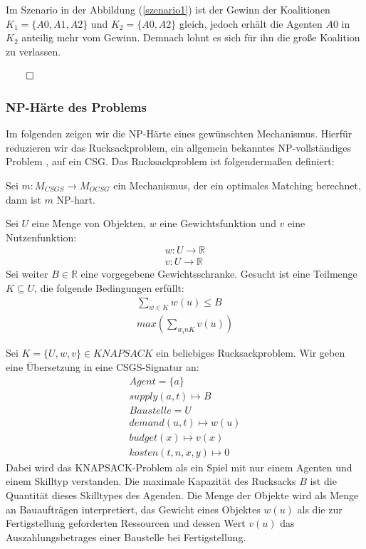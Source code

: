Im Szenario in der Abbildung (\ref{szenario1}) ist der Gewinn der Koalitionen $K_1 = \{A0, A1, A2\}$ und $K_2 = \{A0, A2\}$ gleich, jedoch erhält die Agenten $A0$ in $K_2$ anteilig mehr vom Gewinn. Demnach lohnt es sich für ihn die große Koalition zu verlassen.
\begin{flushright}
  $\qed$
\end{flushright}

\subsubsection{NP-Härte des Problems}
\label{np}
Im folgenden zeigen wir die NP-Härte eines gewünschten Mechanismus. Hierfür reduzieren wir das Rucksackproblem, ein allgemein bekanntes NP-vollständiges Problem \cite{Karp1972}, auf ein CSG.
Das Rucksackproblem ist folgendermaßen definiert:

\begin{lemma}
Sei $m:M_{CSGS}\rightarrow M_{OCSG}$ ein Mechanismus, der ein optimales Matching berechnet, dann ist $m$ NP-hart.
\end{lemma}

\begin{definition}[KNAPSACK]
Sei $U$ eine Menge von Objekten, $w$ eine Gewichtsfunktion und $v$ eine Nutzenfunktion:
\begin{align}
  w: U\rightarrow \mathbb{R} \\
  v: U\rightarrow \mathbb{R}
\end{align}
Sei weiter $B\in\mathbb{R}$ eine vorgegebene Gewichtsschranke.
Gesucht ist eine Teilmenge $K\subseteq U$, die folgende Bedingungen erfüllt:
\begin{align}
  \sum_{w\in K}w(u)\leq B \label{bed1}\\
  max(\sum_{w_in K}v(u)) \label{bed2}
\end{align}
\end{definition}

Sei $K=\{U,w,v\}\in KNAPSACK$ ein beliebiges Rucksackproblem. Wir geben eine Übersetzung in eine CSGS-Signatur an:
\begin{align}
  Agent = \{a\} \\
  supply(a, t) \mapsto B \\
  Baustelle = U \\
  demand(u, t) \mapsto w(u) \\
  budget(x) \mapsto v(x) \\
  kosten(t, n, x, y) \mapsto 0
\end{align}
Dabei wird das KNAPSACK-Problem als ein Spiel mit nur einem Agenten und einem Skilltyp verstanden. Die maximale Kapazität des Rucksacks $B$ ist die Quantität dieses Skilltypes des Agenden. Die Menge der Objekte wird als Menge an Bauaufträgen interpretiert, das Gewicht eines Objektes $w(u)$ als die zur Fertigstellung geforderten Ressourcen und dessen Wert $v(u)$ das Auszahlungsbetrages einer Baustelle bei Fertigstellung.

